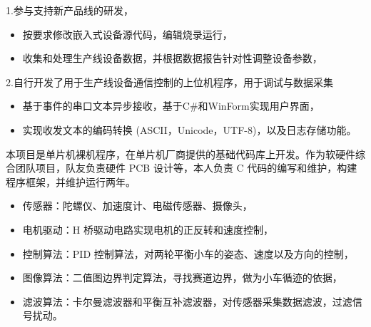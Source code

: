 \documentclass{resume}
\begin{document}
1.参与支持新产品线的研发，
\begin{itemize}
  \item 按要求修改嵌入式设备源代码，编辑烧录运行，
  \item 收集和处理生产线设备数据，并根据数据报告针对性调整设备参数，
\end{itemize}
2.自行开发了用于生产线设备通信控制的上位机程序，用于调试与数据采集
\begin{itemize}
  \item 基于事件的串口文本异步接收，基于C\#和WinForm实现用户界面，
  \item 实现收发文本的编码转换 (ASCII，Unicode，UTF-8)，以及日志存储功能。
\end{itemize}

本项目是单片机裸机程序，在单片机厂商提供的基础代码库上开发。作为软硬件综合团队项目，队友负责硬件 PCB 设计等，本人负责 C 代码的编写和维护，构建程序框架，并维护运行两年。
\begin{itemize}
  \item 传感器：陀螺仪、加速度计、电磁传感器、摄像头，
  \item 电机驱动：H 桥驱动电路实现电机的正反转和速度控制，
  \item 控制算法：PID 控制算法，对两轮平衡小车的姿态、速度以及方向的控制，
  \item 图像算法：二值图边界判定算法，寻找赛道边界，做为小车循迹的依据，
  \item 滤波算法：卡尔曼滤波器和平衡互补滤波器，对传感器采集数据滤波，过滤信号扰动。
\end{itemize}

\end{document}
